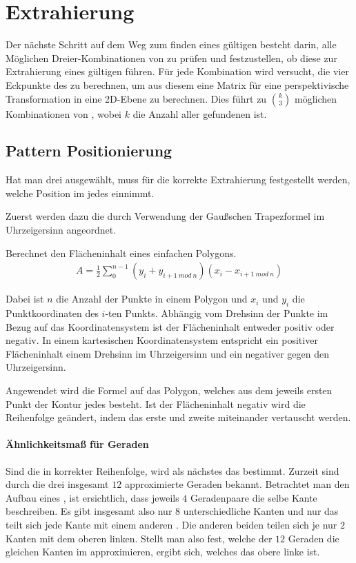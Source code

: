 \chapter{Extrahierung}

Der nächste Schritt auf dem Weg zum finden eines gültigen \QRCodes besteht darin, alle Möglichen Dreier-Kombinationen von \fps zu prüfen und festzustellen, ob diese zur Extrahierung eines gültigen \QRCodes führen. Für jede Kombination wird versucht, die vier Eckpunkte des \QRCodes zu berechnen, um aus diesem eine Matrix für eine perspektivische Transformation in eine 2D-Ebene zu berechnen. Dies führt zu $\binom{k}{3}$ möglichen Kombinationen von \fps, wobei $k$ die Anzahl aller gefundenen \fps ist.

\section{Pattern Positionierung}
Hat man drei \fps ausgewählt, muss für die korrekte Extrahierung festgestellt werden, welche Position im \QRCode jedes \fp einnimmt.

Zuerst werden dazu die \fps durch Verwendung der Gaußschen Trapezformel im Uhrzeigersinn angeordnet.
\begin{theorem}
Berechnet den Flächeninhalt eines einfachen Polygons.
\begin{align}
A=\frac{1}{2} \sum_{0}^{n-1} (y_i + y_{i+1\ mod\ n})(x_i - x_{i+1\ mod\ n})
\end{align}
\end{theorem}
Dabei ist $n$ die Anzahl der Punkte in einem Polygon und $x_i$ und $y_i$ die Punktkoordinaten des $i$-ten Punkts. Abhängig vom Drehsinn der Punkte im Bezug auf das Koordinatensystem ist der Flächeninhalt entweder positiv oder negativ. In einem kartesischen Koordinatensystem entspricht ein positiver Flächeninhalt einem Drehsinn im Uhrzeigersinn und ein negativer gegen den Uhrzeigersinn.

Angewendet wird die Formel auf das Polygon, welches aus dem jeweils ersten Punkt der Kontur jedes \fps besteht. Ist der Flächeninhalt negativ wird die Reihenfolge geändert, indem das erste und zweite \fp miteinander vertauscht werden.
\subsubsection{Ähnlichkeitsmaß für Geraden}
Sind die \fps in korrekter Reihenfolge, wird als nächstes das \olfp bestimmt. Zurzeit sind durch die drei \fps insgesamt $12$ approximierte Geraden bekannt. Betrachtet man den Aufbau eines \QRCodes, ist ersichtlich, dass jeweils $4$ Geradenpaare die selbe Kante beschreiben. Es gibt insgesamt also nur $8$ unterschiedliche Kanten und nur das \olfp teilt sich jede Kante mit einem anderen \fp. Die anderen beiden teilen sich je nur $2$ Kanten mit dem oberen linken. Stellt man also fest, welche der $12$ Geraden die gleichen Kanten im \QRCode approximieren, ergibt sich, welches \fp das obere linke ist.

